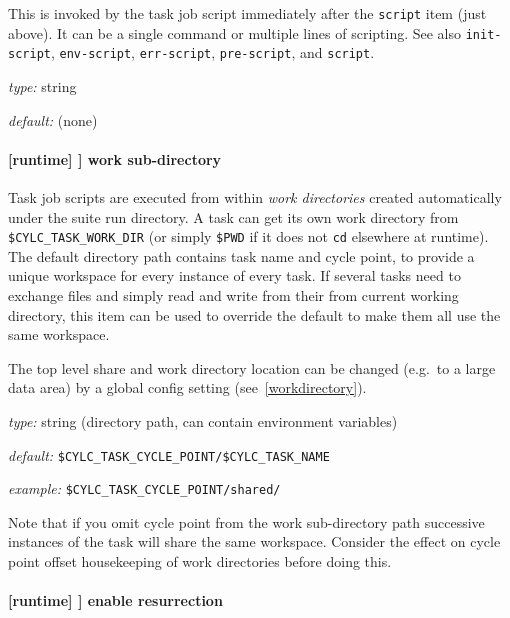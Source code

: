This is invoked by the task job script immediately after the \lstinline=script=
item (just above).  It can be a single command or multiple lines of scripting.
See also
\lstinline=init-script=, \lstinline=env-script=, \lstinline=err-script=,
\lstinline=pre-script=, and \lstinline=script=.

\begin{myitemize}
\item {\em type:} string
\item {\em default:} (none)
\end{myitemize}

\paragraph[work sub-directory]{[runtime] \textrightarrow [[\_\_NAME\_\_]] \textrightarrow work sub-directory}
\label{worksubdirectory}

Task job scripts are executed from within {\em work directories} created
automatically under the suite run directory. A task can get its own work
directory from \lstinline=$CYLC_TASK_WORK_DIR= (or simply \lstinline=$PWD= if
it does not \lstinline=cd= elsewhere at runtime). The default directory
path contains task name and cycle point, to provide a unique workspace for
every instance of every task. If several tasks need to exchange files and
simply read and write from their from current working directory, this item
can be used to override the default to make them all use the same workspace.

The top level share and work directory location can be changed (e.g.\ to a
large data area) by a global config setting (see~\ref{workdirectory}).

\begin{myitemize}
\item {\em type:} string (directory path, can contain environment variables)
\item {\em default:} \lstinline=$CYLC_TASK_CYCLE_POINT/$CYLC_TASK_NAME=
\item {\em example:} \lstinline=$CYLC_TASK_CYCLE_POINT/shared/=
\end{myitemize}

Note that if you omit cycle point from the work sub-directory path successive
instances of the task will share the same workspace.  Consider the effect on
cycle point offset housekeeping of work directories before doing this.

\paragraph[enable resurrection]{ [runtime] \textrightarrow [[\_\_NAME\_\_]] \textrightarrow enable resurrection}

